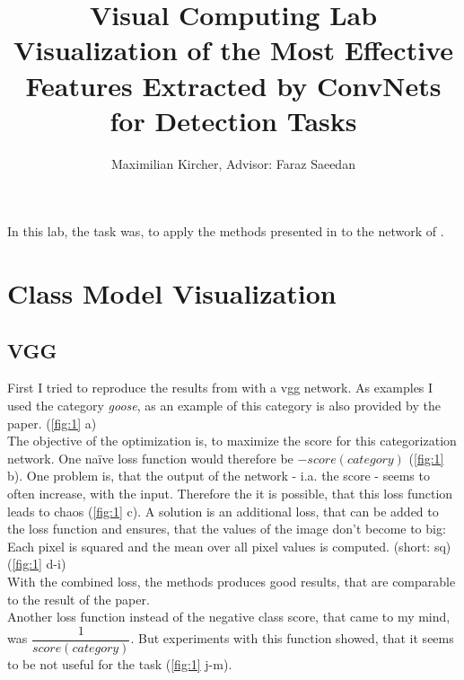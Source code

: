 \documentclass[a4paper, 10pt, deutsch]{llncs}
\begin{document}
\title{{\normalsize Visual Computing Lab} \\
  Visualization of the Most Effective Features Extracted by ConvNets for Detection Tasks}
\author{Maximilian Kircher, Advisor: Faraz Saeedan}

\maketitle

In this lab, the task was, to apply the methods presented in \cite{simonyan2013deep} to the network of \cite{liu2016ssd}.


\section{Class Model Visualization}
\subsection{VGG}

First I tried to reproduce the results from \cite{simonyan2013deep} with a vgg network. As examples I used the category \textit{goose}, as an example of this category is also provided by the paper. (\ref{fig:1} a)\\
The objective of the optimization is, to maximize the score for this categorization network. One na\"ive loss function would therefore be $-score(category)$ (\ref{fig:1} b). One problem is, that the output of the network - i.a. the score - seems to often increase, with the input. Therefore the it is possible, that this loss function leads to chaos (\ref{fig:1} c).
A solution is an additional loss, that can be added to the loss function and ensures, that the values of the image don't become to big: Each pixel is squared and the mean over all pixel values is computed. (short: sq) (\ref{fig:1} d-i)\\
With the combined loss, the methods produces good results, that are comparable to the result of the paper.\\
Another loss function instead of the negative class score, that came to my mind, was $\dfrac{1}{score(category)}$.
But experiments with this function showed, that it seems to be not useful for the task (\ref{fig:1} j-m).
\end{document}

